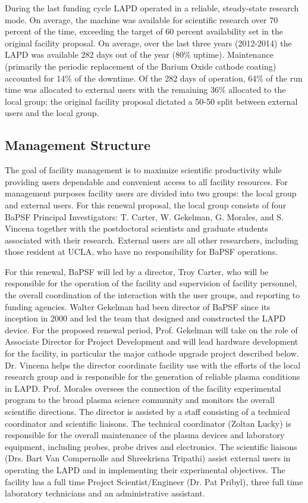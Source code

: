 \documentclass[11pt]{article}
\begin{document}
During the last funding cycle LAPD operated in a reliable, steady-state
research mode. On average, the machine was available for scientific
research over 70 percent of the time, exceeding the target of 60 percent
availability set in the original facility proposal. On average, over the
last three years (2012-2014) the LAPD was available 282 days out of the
year (80\% uptime). Maintenance (primarily the periodic replacement of
the Barium Oxide cathode coating) accounted for 14\% of the downtime. Of
the 282 days of operation, 64\% of the run time was allocated to
external users with the remaining 36\% allocated to the local group; the
original facility proposal dictated a 50-50 split between external
users and the local group.

\subsection{Management Structure}

The goal of facility management is to maximize scientific productivity
while providing users dependable and convenient access to all facility
resources. For management purposes facility users are divided into two
groups: the local group and external users. For this renewal proposal,
the local group consists of four BaPSF Principal Investigators: T.
Carter, W. Gekelman, G. Morales, and S. Vincena together with the
postdoctoral scientists and graduate students associated with their
research. External users are all other researchers, including those
resident at UCLA, who have no responsibility for BaPSF operations.

For this renewal, BaPSF will led by a director, Troy Carter, who will
be responsible for the operation of the facility and supervision of
facility personnel, the overall coordination of the interaction with
the user groups, and reporting to funding agencies. Walter Gekelman
had been director of BaPSF since its inception in 2000 and led the
team that designed and constructed the LAPD device. For the proposed
renewal period, Prof. Gekelman will take on the role of Associate
Director for Project Development and will lead hardware development
for the facility, in particular the major cathode upgrade project
described below. Dr.  Vincena helps the director coordinate facility
use with the efforts of the local research group and is responsible
for the generation of reliable plasma conditions in
LAPD. Prof. Morales oversees the connection of the facility
experimental program to the broad plasma science community and
monitors the overall scientific directions. The director is assisted
by a staff consisting of a technical coordinator and scientific
liaisons. The technical coordinator (Zoltan Lucky) is responsible for
the overall maintenance of the plasma devices and laboratory
equipment, including probes, probe drives and electronics.  The
scientific liaisons (Drs. Bart Van Compernolle and Shreekrisna
Tripathi) assist external users in operating the LAPD and in
implementing their experimental objectives. The facility has a full
time Project Scientist/Engineer (Dr. Pat Pribyl), three full time
laboratory technicians and an administrative assistant.
\end{document}

